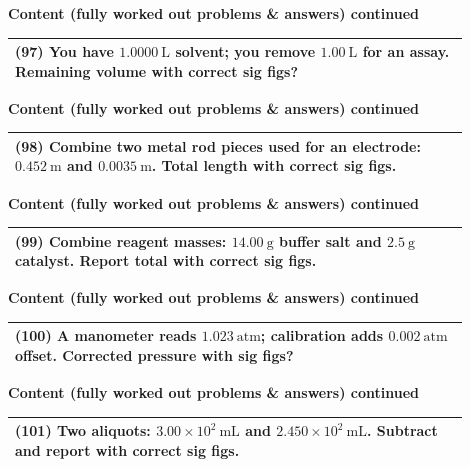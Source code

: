 \documentclass{article}
\begin{document}
\noindent
{\large \textbf{Content (fully worked out problems \& answers) continued}} \\[0.2em]
\begin{tabular}{|p{0.9\linewidth}|}
\hline
\vspace{0.2cm}
\textbf{(97)} You have $1.0000~\text{L}$ solvent; you remove $1.00~\text{L}$ for an assay. Remaining volume with correct sig figs? \\
\hline
\end{tabular}
\newpage

\noindent
{\large \textbf{Content (fully worked out problems \& answers) continued}} \\[0.2em]
\begin{tabular}{|p{0.9\linewidth}|}
\hline
\vspace{0.2cm}
\textbf{(98)} Combine two metal rod pieces used for an electrode: $0.452~\text{m}$ and $0.0035~\text{m}$. Total length with correct sig figs. \\
\hline
\end{tabular}
\newpage

\noindent
{\large \textbf{Content (fully worked out problems \& answers) continued}} \\[0.2em]
\begin{tabular}{|p{0.9\linewidth}|}
\hline
\vspace{0.2cm}
\textbf{(99)} Combine reagent masses: $14.00~\text{g}$ buffer salt and $2.5~\text{g}$ catalyst. Report total with correct sig figs. \\
\hline
\end{tabular}
\newpage

\noindent
{\large \textbf{Content (fully worked out problems \& answers) continued}} \\[0.2em]
\begin{tabular}{|p{0.9\linewidth}|}
\hline
\vspace{0.2cm}
\textbf{(100)} A manometer reads $1.023~\text{atm}$; calibration adds $0.002~\text{atm}$ offset. Corrected pressure with sig figs? \\
\hline
\end{tabular}
\newpage

\noindent
{\large \textbf{Content (fully worked out problems \& answers) continued}} \\[0.2em]
\begin{tabular}{|p{0.9\linewidth}|}
\hline
\vspace{0.2cm}
\textbf{(101)} Two aliquots: $3.00\times10^{2}~\text{mL}$ and $2.450\times10^{2}~\text{mL}$. Subtract and report with correct sig figs. \\
\hline
\end{tabular}
\newpage
\end{document}
